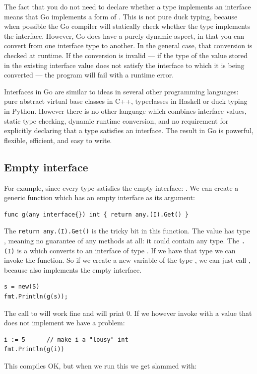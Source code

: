 The fact that you do not need to declare whether a type implements an
interface means that Go implements a form of . This is not
pure duck typing, because when possible the Go compiler will statically
check whether the type implements the interface. However, Go does have a
purely dynamic aspect, in that you can convert from one interface type
to another. In the general case, that conversion is checked at runtime.
If the conversion is invalid --- if the type of the value stored in the
existing interface value does not satisfy the interface to which it is
being converted --- the program will fail with a runtime error.

Interfaces in Go are similar to ideas in several other programming languages:
pure abstract virtual base classes in C++, typeclasses in Haskell or duck typing
in Python. However there is no other language which combines
interface values, static type checking, dynamic runtime conversion, and no
requirement for explicitly declaring that a type satisfies an interface. The
result in Go is powerful, flexible, efficient, and easy to write.

\subsection{Empty interface}
For example, since every type satisfies the empty interface:
. We can create a generic function which 
has an empty interface as its argument:
\begin{lstlisting}[caption=A function with a empty interface
argument,label=src:interface empty]
func g(any interface{}) int { return any.(I).Get() }
\end{lstlisting}
The \lstinline{return any.(I).Get()} is the tricky bit in this function.
The value  has type , meaning no guarantee
of any methods at all: it could contain any type. The \lstinline{.(I)}
is a  which converts  to an interface of
type . If we have that type we can invoke the 
function.
So if we create a new variable of the type , we can just
call , because  also implements the empty interface.
\begin{lstlisting}
s = new(S)
fmt.Println(g(s));
\end{lstlisting}
The call to  will work fine and will print 0. If we however
invoke  with a value that does not implement  we have
a problem:
\begin{lstlisting}[caption=Failing to implement an interface,label=src:interface fail]
i := 5		// make i a "lousy" int
fmt.Println(g(i))
\end{lstlisting}
This compiles OK, but when we run this we get slammed with:

